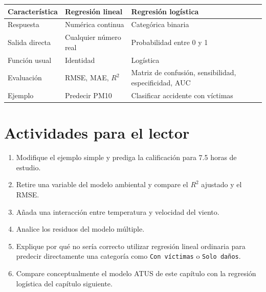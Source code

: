 \documentclass[
  spanish,
  10.5pt,
  letterpaper,
  openany,
  headings=big]{scrbook}
\newcounter{none} %
\providecommand{\tightlist}{%
  \setlength{\itemsep}{0pt}\setlength{\parskip}{0pt}}
\begin{document}
{\def\LTcaptype{none} %
\begin{longtable}[]{@{}
  >{\raggedright\arraybackslash}p{}
  >{\raggedright\arraybackslash}p{}
  >{\raggedright\arraybackslash}p{}@{}}
\toprule\noalign{}
\begin{minipage}[b]{\linewidth}\raggedright
Característica
\end{minipage} & \begin{minipage}[b]{\linewidth}\raggedright
Regresión lineal
\end{minipage} & \begin{minipage}[b]{\linewidth}\raggedright
Regresión logística
\end{minipage} \\
\midrule\noalign{}
\endhead
\bottomrule\noalign{}
\endlastfoot
Respuesta & Numérica continua & Categórica binaria \\
Salida directa & Cualquier número real & Probabilidad entre 0 y 1 \\
Función usual & Identidad & Logística \\
Evaluación & RMSE, MAE, \(R^2\) & Matriz de confusión, sensibilidad,
especificidad, AUC \\
Ejemplo & Predecir PM10 & Clasificar accidente con víctimas \\
\end{longtable}
}

\section{Actividades para el lector}\label{actividades-para-el-lector}

\begin{enumerate}
\def\labelenumi{\arabic{enumi}.}
\tightlist
\item
  Modifique el ejemplo simple y prediga la calificación para 7.5 horas
  de estudio.
\item
  Retire una variable del modelo ambiental y compare el \(R^2\) ajustado
  y el RMSE.
\item
  Añada una interacción entre temperatura y velocidad del viento.
\item
  Analice los residuos del modelo múltiple.
\item
  Explique por qué no sería correcto utilizar regresión lineal ordinaria
  para predecir directamente una categoría como \texttt{Con\ víctimas} o
  \texttt{Solo\ daños}.
\item
  Compare conceptualmente el modelo ATUS de este capítulo con la
  regresión logística del capítulo siguiente.
\end{enumerate}
\end{document}
